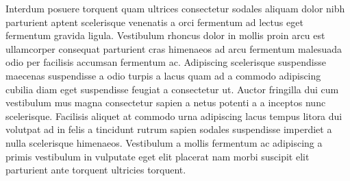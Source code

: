 \par
Interdum posuere torquent quam ultrices consectetur sodales aliquam dolor nibh parturient aptent scelerisque venenatis a orci fermentum ad lectus eget fermentum gravida ligula. Vestibulum rhoncus dolor in mollis proin arcu est ullamcorper consequat parturient cras himenaeos ad arcu fermentum malesuada odio per facilisis accumsan fermentum ac. Adipiscing scelerisque suspendisse maecenas suspendisse a odio turpis a lacus quam ad a commodo adipiscing cubilia diam eget suspendisse feugiat a consectetur ut. Auctor fringilla dui cum vestibulum mus magna consectetur sapien a netus potenti a a inceptos nunc scelerisque. Facilisis aliquet at commodo urna adipiscing lacus tempus litora dui volutpat ad in felis a tincidunt rutrum sapien sodales suspendisse imperdiet a nulla scelerisque himenaeos. Vestibulum a mollis fermentum ac adipiscing a primis vestibulum in vulputate eget elit placerat nam morbi suscipit elit parturient ante torquent ultricies torquent. 

